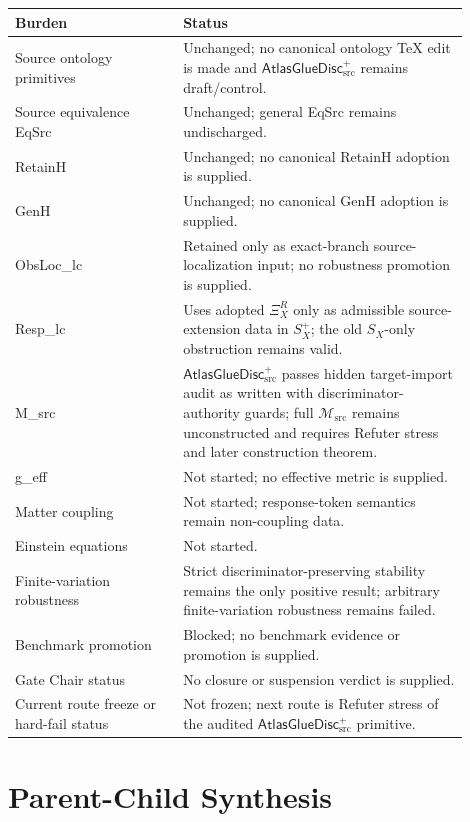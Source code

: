 \documentclass[11pt]{article}
\newcommand{\Msrc}{\mathcal{M}_{\mathrm{src}}}
\newcommand{\XiR}{\Xi_X^R}
\newcommand{\SX}{S_X}
\newcommand{\Splus}{S_X^+}
\newcommand{\AtlasGlueDisc}{\mathsf{AtlasGlueDisc}_{\mathrm{src}}^{+}}
\begin{document}
\begin{center}
\begin{tabular}{p{0.33\linewidth}p{0.57\linewidth}}
\hline
Burden & Status \\
\hline
Source ontology primitives & Unchanged; no canonical ontology TeX edit is made and \(\AtlasGlueDisc\) remains draft/control. \\
Source equivalence EqSrc & Unchanged; general EqSrc remains undischarged. \\
RetainH & Unchanged; no canonical RetainH adoption is supplied. \\
GenH & Unchanged; no canonical GenH adoption is supplied. \\
ObsLoc\_lc & Retained only as exact-branch source-localization input; no robustness promotion is supplied. \\
Resp\_lc & Uses adopted \(\XiR\) only as admissible source-extension data in \(\Splus\); the old \(\SX\)-only obstruction remains valid. \\
M\_src & \(\AtlasGlueDisc\) passes hidden target-import audit as written with discriminator-authority guards; full \(\Msrc\) remains unconstructed and requires Refuter stress and later construction theorem. \\
g\_eff & Not started; no effective metric is supplied. \\
Matter coupling & Not started; response-token semantics remain non-coupling data. \\
Einstein equations & Not started. \\
Finite-variation robustness & Strict discriminator-preserving stability remains the only positive result; arbitrary finite-variation robustness remains failed. \\
Benchmark promotion & Blocked; no benchmark evidence or promotion is supplied. \\
Gate Chair status & No closure or suspension verdict is supplied. \\
Current route freeze or hard-fail status & Not frozen; next route is Refuter stress of the audited \(\AtlasGlueDisc\) primitive. \\
\hline
\end{tabular}
\end{center}

\section{Parent-Child Synthesis}
\end{document}
